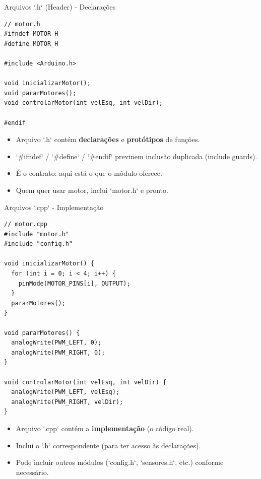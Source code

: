 \documentclass[10pt]{beamer}
\begin{document}
\begin{frame}[fragile]{Arquivos `.h` (Header) - Declarações}
\begin{lstlisting}
// motor.h
#ifndef MOTOR_H
#define MOTOR_H

#include <Arduino.h>

void inicializarMotor();
void pararMotores();
void controlarMotor(int velEsq, int velDir);

#endif
\end{lstlisting}

  \begin{itemize}
    \item Arquivo `.h` contém \textbf{declarações} e \textbf{protótipos} de funções.
    \item `#ifndef` / `#define` / `#endif` previnem inclusão duplicada (include guards).
    \item É o contrato: aqui está o que o módulo oferece.
    \item Quem quer usar motor, inclui `motor.h` e pronto.
  \end{itemize}
\end{frame}

\begin{frame}[fragile]{Arquivos `.cpp` - Implementação}
\begin{lstlisting}
// motor.cpp
#include "motor.h"
#include "config.h"

void inicializarMotor() {
  for (int i = 0; i < 4; i++) {
    pinMode(MOTOR_PINS[i], OUTPUT);
  }
  pararMotores();
}

void pararMotores() {
  analogWrite(PWM_LEFT, 0);
  analogWrite(PWM_RIGHT, 0);
}

void controlarMotor(int velEsq, int velDir) {
  analogWrite(PWM_LEFT, velEsq);
  analogWrite(PWM_RIGHT, velDir);
}
\end{lstlisting}

  \begin{itemize}
    \item Arquivo `.cpp` contém a \textbf{implementação} (o código real).
    \item Inclui o `.h` correspondente (para ter acesso às declarações).
    \item Pode incluir outros módulos (`config.h`, `sensores.h`, etc.) conforme necessário.
  \end{itemize}
\end{frame}
\end{document}
